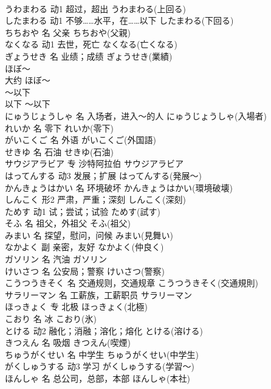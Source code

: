 \documentclass[8pt]{extreport}
\begin{document}
\begin{CJK}{UTF8}{min}
\\	うわまわる	动1	超过，超出	うわまわる(上回る)	
\\	したまわる	动1	不够……水平，在……以下	したまわる(下回る)	
\\	ちちおや	名	父亲	ちちおや(父親)	
\\	なくなる	动1	去世，死亡	なくなる(亡くなる)	
\\	ぎょうせき	名	业绩；成绩	ぎょうせき(業績)	
\\	ほぼ～	
\\	大约	ほぼ～	
\\	～以下	
\\	以下	～以下	
\\	にゅうじょうしゃ	名	入场者，进入～的人	にゅうじょうしゃ(入場者)	
\\	れいか	名	零下	れいか(零下)	
\\	がいこくご	名	外语	がいこくご(外国語)	
\\	せきゆ	名	石油	せきゆ(石油)	
\\	サウジアラビア	专	沙特阿拉伯	サウジアラビア	
\\	はってんする	动3	发展；扩展	はってんする(発展～)	
\\	かんきょうはかい	名	环境破坏	かんきょうはかい(環境破壊)	
\\	しんこく	形2	严肃，严重；深刻	しんこく(深刻)	
\\	ためす	动1	试；尝试；试验	ためす(試す)	
\\	そふ	名	祖父，外祖父	そふ(祖父)	
\\	みまい	名	探望，慰问，问候	みまい(見舞い)	
\\	なかよく	副	亲密，友好	なかよく(仲良く)	
\\	ガソリン	名	汽油	ガソリン	
\\	けいさつ	名	公安局；警察	けいさつ(警察)	
\\	こうつうきそく	名	交通规则，交通规章	こうつうきそく(交通規則)	
\\	サラリーマン	名	工薪族，工薪职员	サラリーマン	
\\	ほっきょく	专	北极	ほっきょく(北極)	
\\	こおり	名	冰	こおり(氷)	
\\	とける	动2	融化；消融；溶化；熔化	とける(溶ける)	
\\	きつえん	名	吸烟	きつえん(喫煙)	
\\	ちゅうがくせい	名	中学生	ちゅうがくせい(中学生)	
\\	がくしゅうする	动3	学习	がくしゅうする(学習～)	
\\	ほんしゃ	名	总公司，总部，本部	ほんしゃ(本社)	

\end{CJK}
\end{document}
